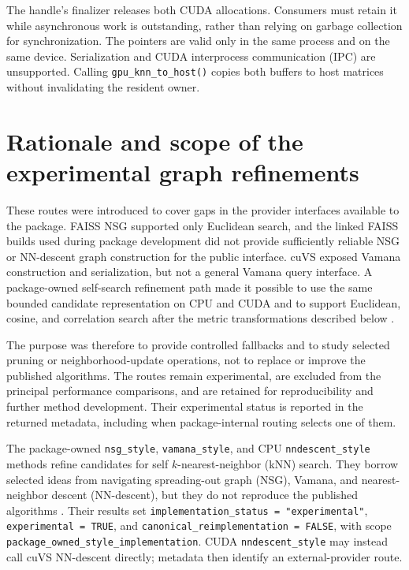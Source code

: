 \documentclass[11pt]{article}
\newcommand{\code}[1]{\texttt{#1}}
\begin{document}
The handle's finalizer releases both CUDA allocations. Consumers must retain
it while asynchronous work is outstanding, rather than relying on garbage
collection for synchronization. The pointers are valid only in the same
process and on the same device. Serialization and CUDA interprocess
communication (IPC) are unsupported. Calling \code{gpu\_knn\_to\_host()}
copies both buffers to host matrices without invalidating the resident owner.

\section{Rationale and scope of the experimental graph refinements}
\label{sec:supp-derived}

These routes were introduced to cover gaps in the provider interfaces available
to the package. FAISS NSG supported only Euclidean search, and the linked FAISS
builds used during package development did not provide sufficiently reliable
NSG or NN-descent graph construction for the public interface. cuVS exposed
Vamana construction and serialization, but not a general Vamana query
interface. A package-owned self-search refinement path made it possible to use
the same bounded candidate representation on CPU and CUDA and to support
Euclidean, cosine, and correlation search after the metric transformations
described below \citep{DouzeEtAl2024,cuVS}.

The purpose was therefore to provide controlled fallbacks and to study selected
pruning or neighborhood-update operations, not to replace or improve the
published algorithms. The routes remain experimental, are excluded from the
principal performance comparisons, and are retained for reproducibility and
further method development. Their experimental status is reported in the
returned metadata, including when package-internal routing selects one of them.

The package-owned \code{nsg\_style}, \code{vamana\_style}, and CPU
\code{nndescent\_style} methods refine candidates for self
$k$-nearest-neighbor (kNN) search. They borrow selected ideas from navigating
spreading-out graph (NSG), Vamana, and nearest-neighbor descent (NN-descent),
but they do not reproduce the published algorithms
\citep{FuEtAl2019,SubramanyaEtAl2019,DongMosesLi2011}. Their results set
\code{implementation\_status = "experimental"}, \code{experimental = TRUE},
and \code{canonical\_reimplementation = FALSE}, with scope
\code{package\_owned\_style\_implementation}. CUDA \code{nndescent\_style}
may instead call cuVS NN-descent directly; metadata then identify an
external-provider route.
\end{document}

